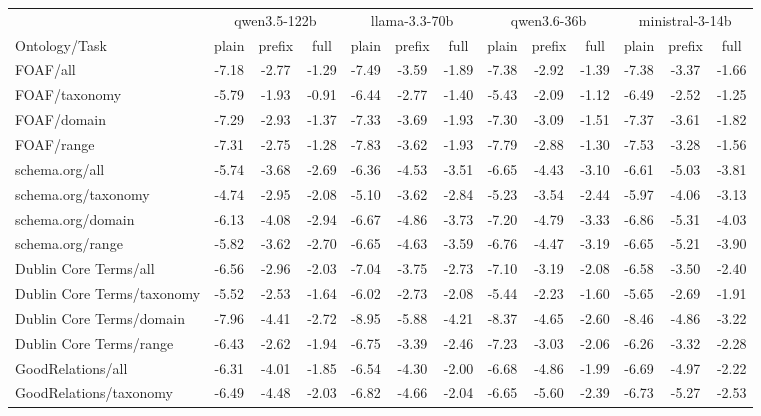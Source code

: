 \begin{tabular}{lcccccccccccc}
\toprule
 & \multicolumn{3}{c}{qwen3.5-122b} & \multicolumn{3}{c}{llama-3.3-70b} & \multicolumn{3}{c}{qwen3.6-36b} & \multicolumn{3}{c}{ministral-3-14b} \\
\cmidrule(lr){2-4} \cmidrule(lr){5-7} \cmidrule(lr){8-10} \cmidrule(lr){11-13}
Ontology/Task & plain & prefix & full & plain & prefix & full & plain & prefix & full & plain & prefix & full \\
\midrule
FOAF/all & -7.18 & -2.77 & -1.29 & -7.49 & -3.59 & -1.89 & -7.38 & -2.92 & -1.39 & -7.38 & -3.37 & -1.66 \\
FOAF/taxonomy & -5.79 & -1.93 & -0.91 & -6.44 & -2.77 & -1.40 & -5.43 & -2.09 & -1.12 & -6.49 & -2.52 & -1.25 \\
FOAF/domain & -7.29 & -2.93 & -1.37 & -7.33 & -3.69 & -1.93 & -7.30 & -3.09 & -1.51 & -7.37 & -3.61 & -1.82 \\
FOAF/range & -7.31 & -2.75 & -1.28 & -7.83 & -3.62 & -1.93 & -7.79 & -2.88 & -1.30 & -7.53 & -3.28 & -1.56 \\
schema.org/all & -5.74 & -3.68 & -2.69 & -6.36 & -4.53 & -3.51 & -6.65 & -4.43 & -3.10 & -6.61 & -5.03 & -3.81 \\
schema.org/taxonomy & -4.74 & -2.95 & -2.08 & -5.10 & -3.62 & -2.84 & -5.23 & -3.54 & -2.44 & -5.97 & -4.06 & -3.13 \\
schema.org/domain & -6.13 & -4.08 & -2.94 & -6.67 & -4.86 & -3.73 & -7.20 & -4.79 & -3.33 & -6.86 & -5.31 & -4.03 \\
schema.org/range & -5.82 & -3.62 & -2.70 & -6.65 & -4.63 & -3.59 & -6.76 & -4.47 & -3.19 & -6.65 & -5.21 & -3.90 \\
Dublin Core Terms/all & -6.56 & -2.96 & -2.03 & -7.04 & -3.75 & -2.73 & -7.10 & -3.19 & -2.08 & -6.58 & -3.50 & -2.40 \\
Dublin Core Terms/taxonomy & -5.52 & -2.53 & -1.64 & -6.02 & -2.73 & -2.08 & -5.44 & -2.23 & -1.60 & -5.65 & -2.69 & -1.91 \\
Dublin Core Terms/domain & -7.96 & -4.41 & -2.72 & -8.95 & -5.88 & -4.21 & -8.37 & -4.65 & -2.60 & -8.46 & -4.86 & -3.22 \\
Dublin Core Terms/range & -6.43 & -2.62 & -1.94 & -6.75 & -3.39 & -2.46 & -7.23 & -3.03 & -2.06 & -6.26 & -3.32 & -2.28 \\
GoodRelations/all & -6.31 & -4.01 & -1.85 & -6.54 & -4.30 & -2.00 & -6.68 & -4.86 & -1.99 & -6.69 & -4.97 & -2.22 \\
GoodRelations/taxonomy & -6.49 & -4.48 & -2.03 & -6.82 & -4.66 & -2.04 & -6.65 & -5.60 & -2.39 & -6.73 & -5.27 & -2.53 \\

\end{tabular}
